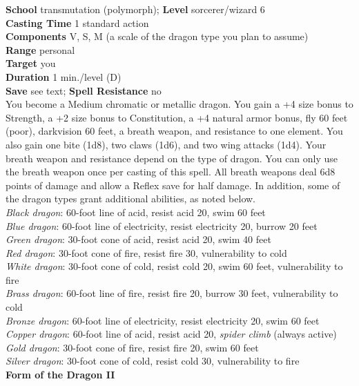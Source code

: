 \textbf{School }transmutation (polymorph); \textbf{Level }sorcerer/wizard 6\\
\textbf{Casting Time }1 standard action\\
\textbf{Components }V, S, M (a scale of the dragon type you plan to assume)\\
\textbf{Range }personal\\
\textbf{Target }you\\
\textbf{Duration }1 min./level (D)\\
\textbf{Save }see text; \textbf{Spell Resistance} no\\
You become a Medium chromatic or metallic dragon. You gain a +4 size bonus to Strength, a +2 size bonus to Constitution, a +4 natural armor bonus, fly 60 feet (poor), darkvision 60 feet, a breath weapon, and resistance to one element. You also gain one bite (1d8), two claws (1d6), and two wing attacks (1d4). Your breath weapon and resistance depend on the type of dragon. You can only use the breath weapon once per casting of this spell. All breath weapons deal 6d8 points of damage and allow a Reflex save for half damage. In addition, some of the dragon types grant additional abilities, as noted below.\\
\textit{Black dragon}: 60-foot line of acid, resist acid 20, swim 60 feet\\
\textit{Blue dragon}: 60-foot line of electricity, resist electricity 20, burrow 20 feet\\
\textit{Green dragon}: 30-foot cone of acid, resist acid 20, swim 40 feet\\
\textit{Red dragon}: 30-foot cone of fire, resist fire 30, vulnerability to cold\\
\textit{White dragon}: 30-foot cone of cold, resist cold 20, swim 60 feet, vulnerability to fire\\
\textit{Brass dragon}: 60-foot line of fire, resist fire 20, burrow 30 feet, vulnerability to cold\\
\textit{Bronze dragon}: 60-foot line of electricity, resist electricity 20, swim 60 feet\\
\textit{Copper dragon}: 60-foot line of acid, resist acid 20, \textit{spider climb} (always active)\\
\textit{Gold dragon}: 30-foot cone of fire, resist fire 20, swim 60 feet\\
\textit{Silver dragon}: 30-foot cone of cold, resist cold 30, vulnerability to fire\\
\textbf{Form of the Dragon II}\\
